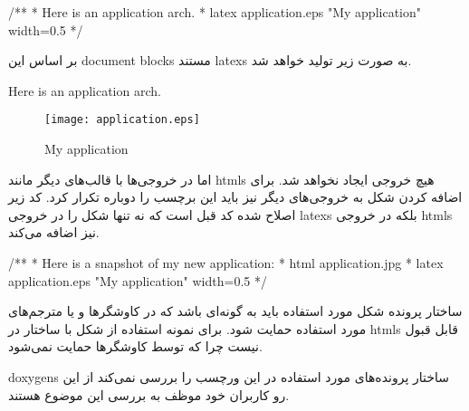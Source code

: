 \begin{Java}
/**
 * Here is an application arch. 
 *  \image latex application.eps "My application" width=0.5\textwidth
 */
\end{Java}

بر اساس این \glspl{document block} مستند \glspl{latex} به صورت زیر تولید خواهد
شد.

\begin{latex}
Here is an application arch.

\begin{figure}
\texttt{[image: application.eps]}
\caption{My application}
\end{figure}
\end{latex}

اما در خروجی‌ها با قالب‌های دیگر مانند \glspl{html} هیچ خروجی ایجاد نخواهد شد.
برای اضافه کردن شکل به خروجی‌های دیگر نیز باید این برچسب را دوباره تکرار کرد. کد
زیر اصلاح شده کد قبل است که نه تنها شکل را در خروجی \glspl{latex} بلکه در خروجی
\glspl{html}‌ نیز اضافه می‌کند.

\begin{Java}
/**
 * Here is a snapshot of my new application:
 *  \image html application.jpg
 *  \image latex application.eps "My application" width=0.5\textwidth
 */
\end{Java}


\begin{warning}
ساختار پرونده شکل مورد استفاده باید به گونه‌ای باشد که در کاوشگرها و یا
مترجم‌های مورد استفاده حمایت شود. برای نمونه استفاده از شکل با ساختار 
در \glspl{html} قابل قبول نیست چرا که توسط کاوشگرها حمایت نمی‌شود.

\glspl{doxygen} ساختار پرونده‌های مورد استفاده در این ورچسب را بررسی نمی‌کند از
این رو کاربران خود موظف به بررسی این موضوع هستند.
\end{warning}






